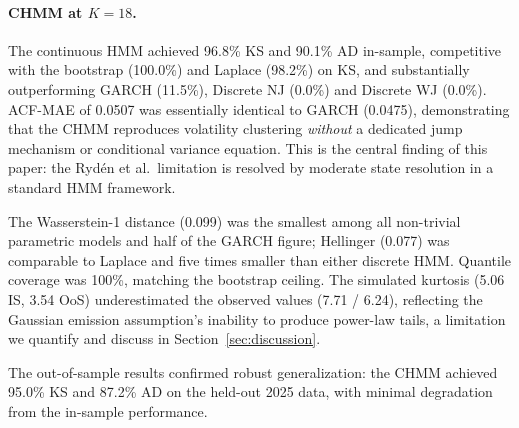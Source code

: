 \paragraph{CHMM at $K = 18$.}
The continuous HMM achieved 96.8\% KS and 90.1\% AD in-sample, competitive with the bootstrap (100.0\%) and Laplace (98.2\%) on KS, and substantially outperforming GARCH (11.5\%), Discrete NJ (0.0\%) and Discrete WJ (0.0\%).
ACF-MAE of 0.0507 was essentially identical to GARCH (0.0475), demonstrating that the CHMM reproduces volatility clustering \emph{without} a dedicated jump mechanism or conditional variance equation.
This is the central finding of this paper: the Ryd\'{e}n et al.\ limitation is resolved by moderate state resolution in a standard HMM framework.

The Wasserstein-1 distance (0.099) was the smallest among all non-trivial parametric models and half of the GARCH figure; Hellinger (0.077) was comparable to Laplace and five times smaller than either discrete HMM.
Quantile coverage was 100\%, matching the bootstrap ceiling.
The simulated kurtosis (5.06 IS, 3.54 OoS) underestimated the observed values (7.71 / 6.24), reflecting the Gaussian emission assumption's inability to produce power-law tails, a limitation we quantify and discuss in Section~\ref{sec:discussion}.

The out-of-sample results confirmed robust generalization: the CHMM achieved 95.0\% KS and 87.2\% AD on the held-out 2025 data, with minimal degradation from the in-sample performance.

